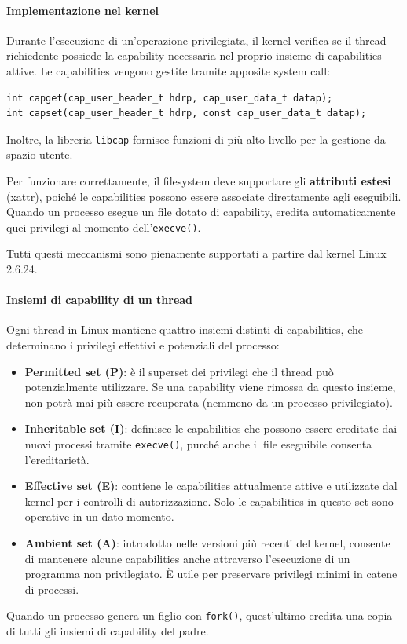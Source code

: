 \paragraph{Implementazione nel kernel}
Durante l’esecuzione di un’operazione privilegiata, il kernel verifica se il thread richiedente possiede la capability necessaria nel proprio insieme di capabilities attive.
Le capabilities vengono gestite tramite apposite system call:
\begin{verbatim}
int capget(cap_user_header_t hdrp, cap_user_data_t datap);
int capset(cap_user_header_t hdrp, const cap_user_data_t datap);
\end{verbatim}
Inoltre, la libreria \texttt{libcap} fornisce funzioni di più alto livello per la gestione da spazio utente.

Per funzionare correttamente, il filesystem deve supportare gli \textbf{attributi estesi} (xattr), poiché le capabilities possono essere associate direttamente agli eseguibili.
Quando un processo esegue un file dotato di capability, eredita automaticamente quei privilegi al momento dell’\texttt{execve()}.

Tutti questi meccanismi sono pienamente supportati a partire dal kernel Linux 2.6.24.

\paragraph{Insiemi di capability di un thread}
Ogni thread in Linux mantiene quattro insiemi distinti di capabilities, che determinano i privilegi effettivi e potenziali del processo:
\begin{itemize}
  \item \textbf{Permitted set (P)}: è il superset dei privilegi che il thread può potenzialmente utilizzare.
        Se una capability viene rimossa da questo insieme, non potrà mai più essere recuperata (nemmeno da un processo privilegiato).
  \item \textbf{Inheritable set (I)}: definisce le capabilities che possono essere ereditate dai nuovi processi tramite \texttt{execve()}, purché anche il file eseguibile consenta l’ereditarietà.
  \item \textbf{Effective set (E)}: contiene le capabilities attualmente attive e utilizzate dal kernel per i controlli di autorizzazione.
        Solo le capabilities in questo set sono operative in un dato momento.
  \item \textbf{Ambient set (A)}: introdotto nelle versioni più recenti del kernel, consente di mantenere alcune capabilities anche attraverso l’esecuzione di un programma non privilegiato.
        È utile per preservare privilegi minimi in catene di processi.
\end{itemize}
Quando un processo genera un figlio con \texttt{fork()}, quest’ultimo eredita una copia di tutti gli insiemi di capability del padre.

